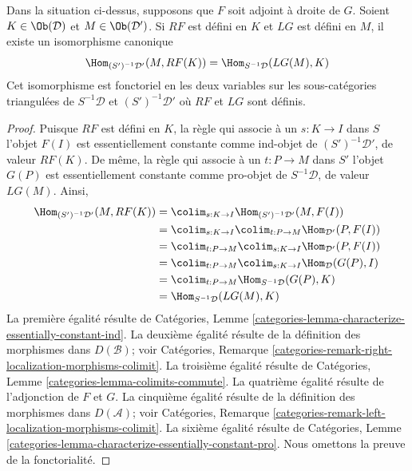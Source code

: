 \begin{lemma}
\label{lemma-pre-derived-adjoint-functors-general}
Dans la situation ci-dessus, supposons que $F$ soit adjoint à droite de $G$.
Soient $K \in \Ob(\mathcal{D})$ et $M \in \Ob(\mathcal{D}')$.
Si $RF$ est défini en $K$ et $LG$ est défini en $M$, il existe un
isomorphisme canonique
$$
\Hom_{(S')^{-1}\mathcal{D}'}(M, RF(K)) =
\Hom_{S^{-1}\mathcal{D}}(LG(M), K)
$$
Cet isomorphisme est fonctoriel en les deux variables sur les sous-catégories
triangulées de $S^{-1}\mathcal{D}$ et $(S')^{-1}\mathcal{D}'$ où $RF$ et
$LG$ sont définis.
\end{lemma}

\begin{proof}
Puisque $RF$ est défini en $K$, la règle qui associe à un
$s : K \to I$ dans $S$ l'objet $F(I)$ est essentiellement constante comme
ind-objet de $(S')^{-1}\mathcal{D}'$, de valeur $RF(K)$.
De même, la règle qui associe à un $t : P \to M$ dans $S'$ l'objet $G(P)$ est
essentiellement constante comme pro-objet de $S^{-1}\mathcal{D}$, de valeur
$LG(M)$. Ainsi,
\begin{align*}
\Hom_{(S')^{-1}\mathcal{D}'}(M, RF(K))
& =
\colim_{s : K \to I} \Hom_{(S')^{-1}\mathcal{D}'}(M, F(I)) \\
& =
\colim_{s : K \to I} \colim_{t : P \to M} \Hom_{\mathcal{D}'}(P, F(I)) \\
& =
\colim_{t : P \to M} \colim_{s : K \to I} \Hom_{\mathcal{D}'}(P, F(I)) \\
& =
\colim_{t : P \to M} \colim_{s : K \to I} \Hom_{\mathcal{D}}(G(P), I) \\
& =
\colim_{t : P \to M} \Hom_{S^{-1}\mathcal{D}}(G(P), K) \\
& =
\Hom_{S^{-1}\mathcal{D}}(LG(M), K)
\end{align*}
La première égalité résulte de
Catégories, Lemme \ref{categories-lemma-characterize-essentially-constant-ind}.
La deuxième égalité résulte de la définition des morphismes dans
$D(\mathcal{B})$; voir Catégories, Remarque
\ref{categories-remark-right-localization-morphisms-colimit}.
La troisième égalité résulte de
Catégories, Lemme \ref{categories-lemma-colimits-commute}.
La quatrième égalité résulte de l'adjonction de $F$ et $G$.
La cinquième égalité résulte de la définition des morphismes dans
$D(\mathcal{A})$; voir Catégories, Remarque
\ref{categories-remark-left-localization-morphisms-colimit}.
La sixième égalité résulte de
Catégories, Lemme \ref{categories-lemma-characterize-essentially-constant-pro}.
Nous omettons la preuve de la fonctorialité.
\end{proof}

